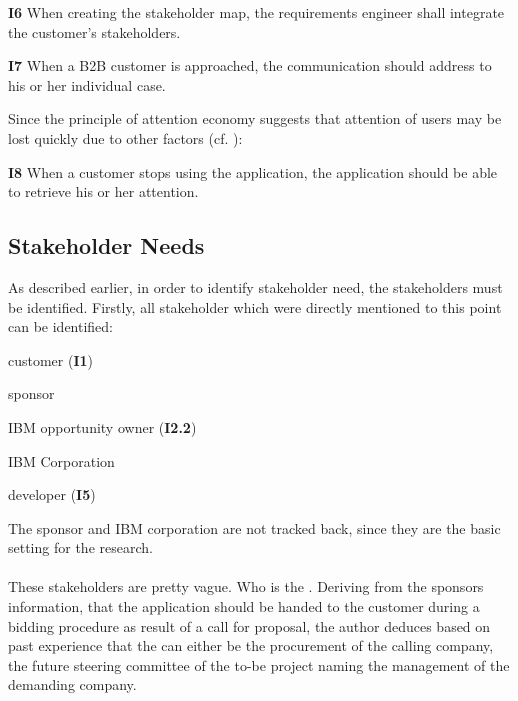 \begin{closeItem}
    \item [\textbf{I6}] When creating the stakeholder map, the requirements engineer shall integrate the customer's stakeholders.
    \item [\textbf{I7}] When a B2B customer is approached, the communication should address to his or her individual case.
\end{closeItem}

Since the principle of attention economy suggests that attention of users may be lost quickly due to other factors (cf. \Cref{}):

\begin{closeItem}
    \item [\textbf{I8}] When a customer stops using the application, the application should be able to retrieve his or her attention.
\end{closeItem}

\paragraph{}

\subsection{Stakeholder Needs}
As described earlier, in order to identify stakeholder need, the stakeholders must be identified. Firstly, all stakeholder which were directly mentioned to this point can be identified:

\begin{closeItemCol}
    \item customer (\textbf{I1})
    \item sponsor
    \item IBM opportunity owner (\textbf{I2.2})
    \item IBM Corporation
    \item developer (\textbf{I5})
\end{closeItemCol}

The sponsor and IBM corporation are not tracked back, since they are the basic setting for the research.

\paragraph{} These stakeholders are pretty vague. Who is the . Deriving from the sponsors information, that the application should be handed to the customer during a bidding procedure as result of a call for proposal, the author deduces based on past experience that the  can either be the procurement of the calling company, the future steering committee of the to-be project naming the management of the demanding company. 

